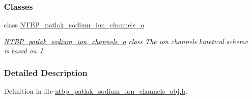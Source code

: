 \subsubsection*{Classes}
\begin{DoxyCompactItemize}
\item 
class \hyperlink{class_n_t_b_p__patlak__sodium__ion__channels__o}{NTBP\_\-patlak\_\-sodium\_\-ion\_\-channels\_\-o}
\begin{DoxyCompactList}\small\item\em \hyperlink{class_n_t_b_p__patlak__sodium__ion__channels__o}{NTBP\_\-patlak\_\-sodium\_\-ion\_\-channels\_\-o} class The ion channels kinetical scheme is based on J. \item\end{DoxyCompactList}\end{DoxyCompactItemize}


\subsubsection{Detailed Description}


Definition in file \hyperlink{ntbp__patlak__sodium__ion__channels__obj_8h_source}{ntbp\_\-patlak\_\-sodium\_\-ion\_\-channels\_\-obj.h}.


